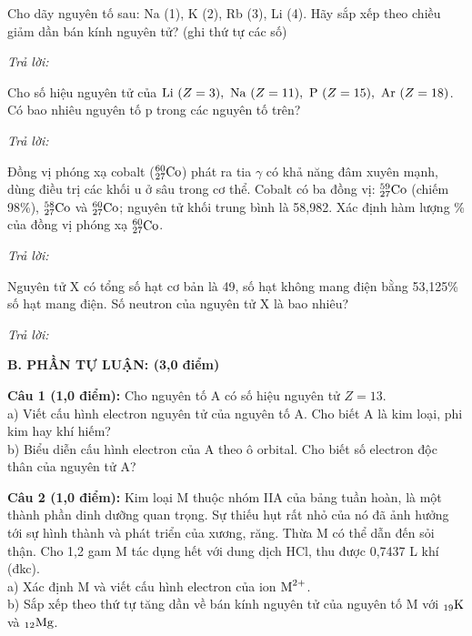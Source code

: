 \documentclass[11pt,a4paper]{article}
\begin{document}
\begin{ex}
Cho dãy nguyên tố sau: Na (1), K (2), Rb (3), Li (4). Hãy sắp xếp theo chiều giảm dần bán kính nguyên tử? (ghi thứ tự các số)

\noindent\textit{Trả lời:} \dotfill
\end{ex}
\begin{ex}
Cho số hiệu nguyên tử của $\ce{Li}\ (Z=3),\ \ce{Na}\ (Z=11),\ \ce{P}\ (Z=15),\ \ce{Ar}\ (Z=18)$. Có bao nhiêu nguyên tố p trong các nguyên tố trên?

\noindent\textit{Trả lời:} \dotfill
\end{ex}
\begin{ex}
Đồng vị phóng xạ cobalt ($^{60}_{27}\ce{Co}$) phát ra tia $\gamma$ có khả năng đâm xuyên mạnh, dùng điều trị các khối u ở sâu trong cơ thể. Cobalt có ba đồng vị: $^{59}_{27}\ce{Co}$ (chiếm 98\%), $^{58}_{27}\ce{Co}$ và $^{60}_{27}\ce{Co}$; nguyên tử khối trung bình là 58,982. Xác định hàm lượng \% của đồng vị phóng xạ $^{60}_{27}\ce{Co}$.

\noindent\textit{Trả lời:} \dotfill
\end{ex}
\begin{ex}
Nguyên tử X có tổng số hạt cơ bản là 49, số hạt không mang điện bằng 53,125\% số hạt mang điện. Số neutron của nguyên tử X là bao nhiêu?

\noindent\textit{Trả lời:} \dotfill
\end{ex}
\vspace{6pt}
\noindent
{\color{mainGreen}\textbf{\Large B. PHẦN TỰ LUẬN: (3,0 điểm)}}
\vspace{2pt}

\noindent
\textbf{Câu 1 (1,0 điểm):} Cho nguyên tố A có số hiệu nguyên tử $Z = 13$.\\
a) Viết cấu hình electron nguyên tử của nguyên tố A. Cho biết A là kim loại, phi kim hay khí hiếm?\\
b) Biểu diễn cấu hình electron của A theo ô orbital. Cho biết số electron độc thân của nguyên tử A?

\vspace{1pt}
\noindent
{}

\vspace{4pt}
\noindent
\textbf{Câu 2 (1,0 điểm):} Kim loại M thuộc nhóm IIA của bảng tuần hoàn, là một thành phần dinh dưỡng quan trọng. Sự thiếu hụt rất nhỏ của nó đã ảnh hưởng tới sự hình thành và phát triển của xương, răng. Thừa M có thể dẫn đến sỏi thận. Cho 1,2 gam M tác dụng hết với dung dịch HCl, thu được 0,7437 L khí (đkc).\\
a) Xác định M và viết cấu hình electron của ion $\ce{M^{2+}}$.\\
b) Sắp xếp theo thứ tự tăng dần về bán kính nguyên tử của nguyên tố M với $_{19}\ce{K}$ và $_{12}\ce{Mg}$.
\end{document}
